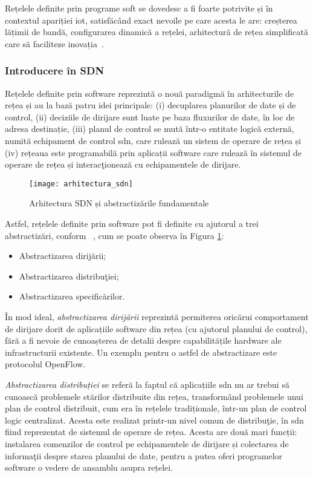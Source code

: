 Rețelele definite prin programe soft se dovedesc a fi foarte potrivite și în contextul apariției \gls{iot}, satisfăcând exact nevoile pe care acesta le are: creșterea lățimii de bandă, configurarea dinamică a rețelei, arhitectură de rețea simplificată care să faciliteze inovația~\cite{qin2014software}.

\subsubsection{Introducere în SDN}

Rețelele definite prin software reprezintă o nouă paradigmă în arhitecturile de rețea și au la bază patru idei principale: (i) decuplarea planurilor de date și de control, (ii) deciziile de dirijare sunt luate pe baza fluxurilor de date, în loc de adresa destinație, (iii) planul de control se mută într-o entitate logică externă, numită echipament de control \gls{sdn}, care rulează un sistem de operare de rețea și (iv) rețeaua este programabilă prin aplicații software care rulează în sistemul de operare de rețea și interacţionează cu echipamentele de dirijare.

\begin{figure}[h]
	\centering
	\texttt{[image: arhitectura\_sdn]}
	\caption{Arhitectura SDN și abstractizările fundamentale~\cite{kreutz2015software}}
	\label{fig:arhitectura_sdn}
\end{figure}

Astfel, rețelele definite prin software pot fi definite cu ajutorul a trei abstractizări, conform ~\cite{kreutz2015software}, cum se poate observa în Figura \ref{fig:arhitectura_sdn}:
\begin{itemize}
	\item Abstractizarea dirijării;
	\item Abstractizarea distribuţiei;
	\item Abstractizarea specificărilor.	 
\end{itemize}

În mod ideal, \textit{abstractizarea dirijării} reprezintă permiterea oricărui comportament de dirijare dorit de aplicațiile software din rețea (cu ajutorul planului de control),  fără a fi nevoie de cunoașterea de detalii despre capabilitățile hardware ale infrastructurii existente. Un exemplu pentru o astfel de abstractizare este protocolul OpenFlow.

\textit{Abstractizarea distribuției} se referă la faptul că aplicațiile \gls{sdn} nu ar trebui să cunoască problemele stărilor distribuite din rețea, transformând problemele unui plan de control distribuit, cum era în rețelele tradiționale, într-un plan de control logic centralizat. Acesta este realizat printr-un nivel comun de distribuţie, în \gls{sdn} fiind reprezentat de sistemul de operare de rețea. Acesta are două mari funcții: instalarea comenzilor de control pe echipamentele de dirijare și colectarea de informaţii despre starea planului de date, pentru a putea oferi programelor software o vedere de ansamblu asupra rețelei.

